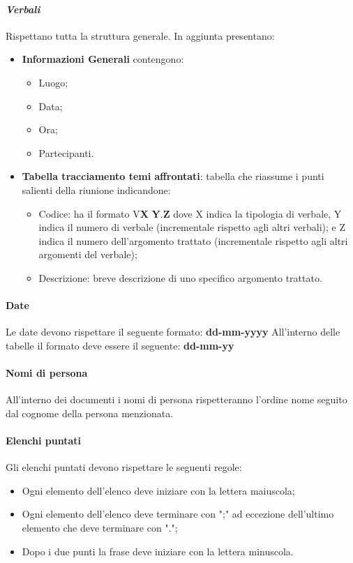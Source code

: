 \paragraph{\textit{Verbali}}
Rispettano tutta la struttura generale.
In aggiunta presentano:
\begin{itemize} 
    \item \textbf{Informazioni Generali}
    contengono:
    \begin{itemize} 
        \item Luogo;
        \item Data;
        \item Ora;
        \item Partecipanti.
    \end{itemize}
\item \textbf{Tabella tracciamento temi affrontati}:
tabella che riassume i punti salienti della riunione indicandone:
    \begin{itemize} 
        \item Codice: ha il formato V\textbf{X} \textbf{Y}.\textbf{Z} dove X indica la tipologia di verbale, Y indica il numero di verbale (incrementale rispetto agli altri verbali);
        e Z indica il numero dell'argomento trattato (incrementale rispetto agli altri argomenti del verbale);
        \item Descrizione: breve descrizione di uno specifico argomento trattato.
    \end{itemize}

\end{itemize}

\paragraph{Date}
Le date devono rispettare il seguente formato: \textbf{dd-mm-yyyy}
All'interno delle tabelle il formato deve essere il seguente: \textbf{dd-mm-yy}
\paragraph{Nomi di persona}
All'interno dei documenti i nomi di persona rispetteranno l'ordine nome seguito dal cognome della persona menzionata.

\paragraph{Elenchi puntati}
Gli elenchi puntati devono rispettare le seguenti regole:
\begin{itemize} 
    \item Ogni elemento dell'elenco deve iniziare con la lettera maiuscola;
    \item Ogni elemento dell'elenco deve terminare con ";" ad eccezione dell'ultimo elemento
    che deve terminare con "."; 
    \item Dopo i due punti la frase deve iniziare con la lettera minuscola.
\end{itemize}

